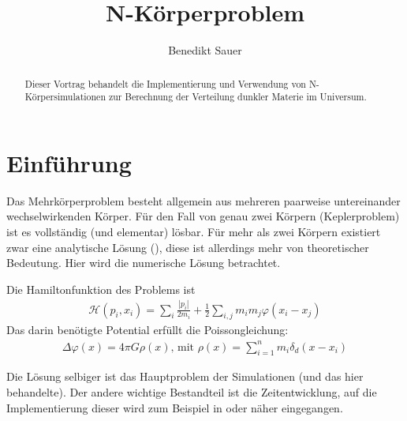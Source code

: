 \documentclass[a4paper]{scrartcl}
\author{Benedikt Sauer}
\title{N-Körperproblem}
\begin{document}
\maketitle
\begin{abstract}
  Dieser Vortrag behandelt die Implementierung und Verwendung von
  N-Körpersimulationen zur Berechnung der Verteilung dunkler Materie im
  Universum.
\end{abstract}
\section{Einführung}
Das Mehrkörperproblem besteht allgemein aus mehreren paarweise untereinander
wechselwirkenden Körper. Für den Fall von genau zwei Körpern (Keplerproblem) ist
es vollständig (und elementar) lösbar. Für mehr als zwei Körpern existiert zwar
eine analytische Lösung (\cite{wang}), diese ist allerdings mehr von
theoretischer Bedeutung. Hier wird die numerische Lösung betrachtet.

Die Hamiltonfunktion des Problems ist
\begin{align}
  \mathcal{H}(p_i, x_i) = \sum_i \frac{\left|p_i\right|}{2m_i} +
  \frac{1}{2} \sum_{i,j} m_i m_j \varphi(x_i - x_j)
  \label{eq:hamilton}
\end{align}
Das darin benötigte Potential erfüllt die Poissongleichung:
\begin{align}
  \Delta \varphi(x) = 4\pi G \rho(x)\text{, mit }\rho(x) = \sum_{i=1}^n m_i
  \delta_d(x - x_i)
  \label{eq:poisson}
\end{align}

Die Lösung selbiger ist das Hauptproblem der Simulationen (und das hier
behandelte). Der andere wichtige Bestandteil ist die Zeitentwicklung, auf die
Implementierung dieser wird zum Beispiel in \cite{time-evo} oder
\cite{time-evo2} näher eingegangen.
\end{document}
